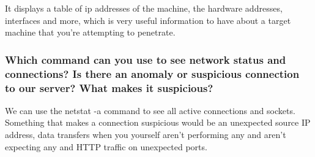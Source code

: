 It displays a table of ip addresses of the machine, the hardware addresses, interfaces and more, which is very useful information to have about a target machine that you're attempting to penetrate.

\subsubsection{Which command can you use to see network status and connections? Is there an anomaly or suspicious connection to our server? What makes it suspicious?}
We can use the netstat -a command to see all active connections and sockets. Something that makes a connection suspicious would be an unexpected source IP address, data transfers when you yourself aren't performing any and aren't expecting any and HTTP traffic on unexpected ports.